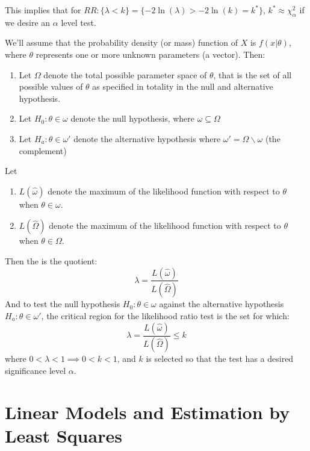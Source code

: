 \documentclass[12pt, a4paper, twoside, openright, titlepage]{book}
\begin{document}
This implies that for $RR:\{\lambda < k\} = \{-2\ln(\lambda) > -2\ln(k) = k^*\}$, $k^* \approx \chi^2_{\alpha}$ if we desire an $\alpha$ level test.


\begin{nota}{}{}
    We'll assume that the probability density (or mass) function of $X$ is $f(x\vert\theta)$, where $\theta$ represents one or more unknown parameters (a vector). Then: \begin{enumerate}
        \item Let $\Omega$ denote the total possible parameter space of $\theta$, that is the set of all possible values of $\theta$ as specified in totality in the null and alternative hypothesis.
        \item Let $H_0:\theta \in \omega$ denote the null hypothesis, where $\omega \subseteq \Omega$
        \item Let $H_a:\theta \in \omega'$ denote the alternative hypothesis where $\omega' = \Omega\backslash \omega$ (the complement)
    \end{enumerate}
\end{nota}

\begin{defn}{}{}
    Let \begin{enumerate}
        \item $L(\hat{\omega})$ denote the maximum of the likelihood function with respect to $\theta$ when $\theta \in \omega$.
        \item $L(\hat{\Omega})$ denote the maximum of the likelihood function with respect to $\theta$ when $\theta \in \Omega$.
    \end{enumerate}
    Then the  is the quotient: \begin{equation*}
        \lambda = \frac{L(\hat{\omega})}{L(\hat{\Omega})}
    \end{equation*}
    And to test the null hypothesis $H_0:\theta \in \omega$ against the alternative hypothesis $H_a:\theta \in \omega'$, the critical region for the likelihood ratio test is the set for which: \begin{equation*}
        \lambda = \frac{L(\hat{\omega})}{L(\hat{\Omega})} \leq k
    \end{equation*}
    where $0 < \lambda < 1 \implies 0 < k < 1$, and $k$ is selected so that the test has a desired significance level $\alpha$.
\end{defn}



\chapter{Linear Models and Estimation by Least Squares}
\end{document}
